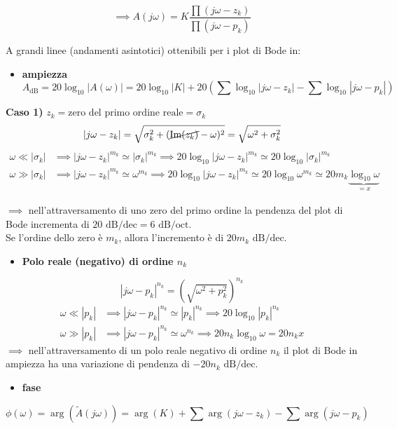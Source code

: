 \documentclass[11pt,a4paper]{report}
\begin{document}
\[
    \implies A(j\omega) = K \frac{\prod (j\omega - z_k)}{\prod (j\omega - p_k)}
\]

A grandi linee (andamenti asintotici) ottenibili per i plot di Bode in:
\begin{itemize}
    \item \textbf{ampiezza}
    \[
        A_{\text{dB}} = 20 \log_{10} |A(\omega)| = 20 \log_{10} |K| + 20 \left( \sum \log_{10} |j\omega - z_k| - \sum \log_{10} |j\omega - p_k| \right)
    \]
\end{itemize}

\textbf{Caso 1)} $z_k = \text{zero del primo ordine reale} = \sigma_k$
\[
    |j\omega - z_k| = \sqrt{\sigma_k^2 + (\cancel{\text{Im}(z_k)} - \omega)^2} = \sqrt{\omega^2 + \sigma_k^2}
\]
\begin{align*}
    \omega \ll |\sigma_k| &\implies |j\omega - z_k|^{m_k} \simeq |\sigma_k|^{m_k} \implies 20 \log_{10} |j\omega - z_k|^{m_k} \simeq 20 \log_{10} |\sigma_k|^{m_k} \\
    \omega \gg |\sigma_k| &\implies |j\omega - z_k|^{m_k} \simeq \omega^{m_k} \implies 20 \log_{10} |j\omega - z_k|^{m_k} \simeq 20 \log_{10} \omega^{m_k} \simeq 20 m_k \underbrace{\log_{10} \omega}_{=x}
\end{align*}

$\implies$ nell'attraversamento di uno zero del primo ordine la pendenza del plot di Bode incrementa di $20 \text{ dB/dec} = 6 \text{ dB/oct}$. \\
Se l'ordine dello zero è $m_k$, allora l'incremento è di $20 m_k \text{ dB/dec}$.

\begin{itemize}
    \item \textbf{Polo reale (negativo) di ordine $n_k$}
\end{itemize}
\[
    |j\omega - p_k|^{n_k} = \left(\sqrt{\omega^2 + p_k^2}\right)^{n_k}
\]
\begin{align*}
    \omega \ll |p_k| &\implies |j\omega - p_k|^{n_k} \simeq |p_k|^{n_k} \implies 20 \log_{10} |p_k|^{n_k} \\
    \omega \gg |p_k| &\implies |j\omega - p_k|^{n_k} \simeq \omega^{n_k} \implies 20 n_k \log_{10} \omega = 20 n_k x
\end{align*}
$\implies$ nell'attraversamento di un polo reale negativo di ordine $n_k$ il plot di Bode in ampiezza ha una variazione di pendenza di $-20 n_k \text{ dB/dec}$.

\begin{itemize}
    \item \textbf{fase}
\end{itemize}
\[
    \phi(\omega) = \arg(\tilde{A}(j\omega)) = \arg(K) + \sum \arg(j\omega - z_k) - \sum \arg(j\omega - p_k)
\]
\end{document}
